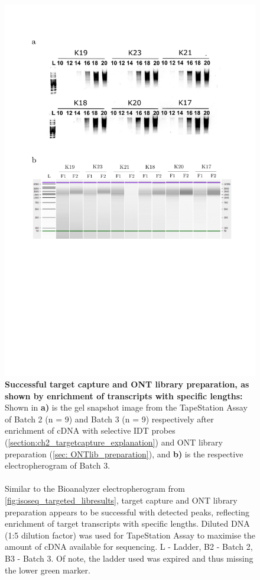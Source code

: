 \begin{figure}[!htp]
	\centering
	\vspace{20pt}
	\includegraphics[page=3,trim={0 28cm 3cm 1cm},clip,scale = 0.45]{Figures/TargetedLabResults.pdf}
	\captionsetup{width=0.95\textwidth}
	\caption[ONT Targeted Transcriptome - Target Capture and library preparation]%
	{\textbf{Successful target capture and ONT library preparation, as shown by enrichment of transcripts with specific lengths:} Shown in \textbf{a)} is the gel snapshot image from the TapeStation Assay of Batch 2 (n = 9) and Batch 3 (n = 9) respectively after enrichment of cDNA with selective IDT probes (\cref{section:ch2_targetcapture_explanation}) and ONT library preparation (\cref{sec: ONTlib_preparation}), and \textbf{b)} is the respective electropherogram of Batch 3. 
	\\
	\\
	Similar to the Bioanalyzer electropherogram from \cref{fig:isoseq_targeted_libresults}, target capture and ONT library preparation appears to be successful with detected peaks, reflecting enrichment of target transcripts with specific lengths. Diluted DNA (1:5 dilution factor) was used for TapeStation Assay to maximise the amount of cDNA available for sequencing. L - Ladder, B2 - Batch 2, B3 - Batch 3. Of note, the ladder used was expired and thus missing the lower green marker. }  
	\label{fig:ONT_targeted_libresults}
\end{figure}


